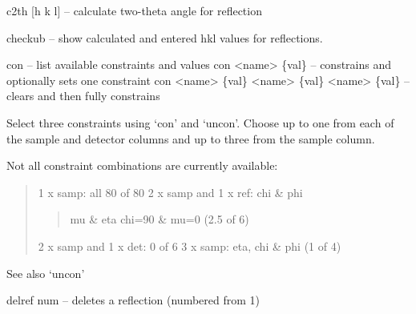 \documentclass[letterpaper,10pt,english]{sphinxmanual}
\begin{document}

\begin{fulllineitems}
\label{Manual:commands.c2th}
c2th {[}h k l{]}  -- calculate two-theta angle for reflection

\end{fulllineitems}


\begin{fulllineitems}
\label{Manual:commands.checkub}
checkub -- show calculated and entered hkl values for reflections.

\end{fulllineitems}


\begin{fulllineitems}
\label{Manual:commands.con}
con -- list available constraints and values
con \textless{}name\textgreater{} \{val\} -- constrains and optionally sets one constraint
con \textless{}name\textgreater{} \{val\} \textless{}name\textgreater{} \{val\} \textless{}name\textgreater{} \{val\} -- clears and then fully constrains

Select three constraints using `con' and `uncon'. Choose up to one
from each of the sample and detector columns and up to three from
the sample column.

Not all constraint combinations are currently available:
\begin{quote}

1 x samp:              all 80 of 80
2 x samp and 1 x ref:  chi \& phi
\begin{quote}

mu \& eta
chi=90 \& mu=0 (2.5 of 6)
\end{quote}

2 x samp and 1 x det:  0 of 6
3 x samp:              eta, chi \& phi (1 of 4)
\end{quote}

See also `uncon'

\end{fulllineitems}


\begin{fulllineitems}
\label{Manual:commands.delref}
delref num -- deletes a reflection (numbered from 1)

\end{fulllineitems}
\end{document}
